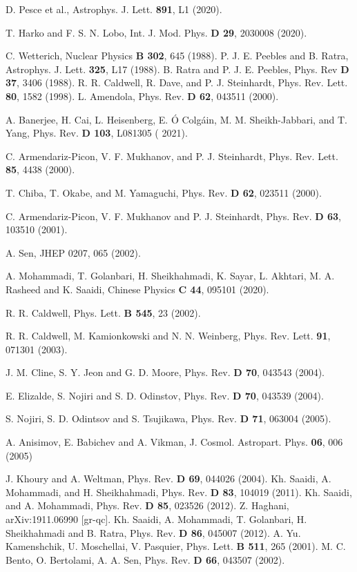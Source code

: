 \documentclass[aps,superscriptaddress, showpacs,preprintnumbers, superscriptaddress, nofootinbibt,twocolumn]{revtex4}
\begin{document}
\begin{thebibliography}{99}
  D. Pesce et al.,  Astrophys. J. Lett. {\bf 891}, L1 (2020).

 T. Harko and F. S. N. Lobo, Int. J. Mod. Phys. {\bf D 29}, 2030008 (2020).

 C. Wetterich, Nuclear Physics {\bf B 302}, 645 (1988).
 P. J. E. Peebles and B. Ratra, Astrophys. J. Lett. {\bf 325},
L17 (1988).
  B. Ratra and P. J. E. Peebles, Phys. Rev {\bf D 37}, 3406
(1988).
 R. R. Caldwell, R. Dave, and P. J. Steinhardt, Phys.
Rev. Lett. {\bf 80}, 1582 (1998).
  L. Amendola, Phys. Rev. {\bf D 62}, 043511 (2000).

 A. Banerjee, H. Cai, L. Heisenberg, E. \'{O} Colg\'{a}in, M. M. Sheikh-Jabbari, and T. Yang, Phys. Rev. {\bf D 103}, L081305 ( 2021).

 C. Armendariz-Picon, V. F. Mukhanov, and P. J. Steinhardt, Phys. Rev. Lett. {\bf 85}, 4438 (2000).

 T. Chiba, T. Okabe, and  M. Yamaguchi, Phys. Rev. {\bf D 62}, 023511 (2000).

 C. Armendariz-Picon, V. F. Mukhanov and P. J. Steinhardt, Phys. Rev. {\bf D 63}, 103510 (2001).

  A. Sen, JHEP 0207, 065 (2002).

 A. Mohammadi, T. Golanbari, H. Sheikhahmadi, K. Sayar, L. Akhtari, M. A. Rasheed and K. Saaidi, Chinese
Physics {\bf C 44}, 095101 (2020).

 R. R. Caldwell, Phys. Lett. {\bf B 545}, 23 (2002).

  R. R. Caldwell, M. Kamionkowski and N. N. Weinberg,
Phys. Rev. Lett. {\bf 91}, 071301 (2003).

  J. M. Cline, S. Y. Jeon and G. D. Moore, Phys. Rev. {\bf D 70}, 043543 (2004).

 E. Elizalde, S. Nojiri and S. D. Odinstov, Phys. Rev. {\bf D 70}, 043539 (2004).

  S. Nojiri, S. D. Odintsov and S. Tsujikawa, Phys. Rev.
{\bf D 71}, 063004 (2005).

 A. Anisimov, E. Babichev and A. Vikman, J. Cosmol.
Astropart. Phys. {\bf 06}, 006 (2005)

 J. Khoury and A. Weltman, Phys. Rev. {\bf D 69}, 044026 (2004).
  Kh. Saaidi, A. Mohammadi, and H. Sheikhahmadi, Phys. Rev. {\bf D 83}, 104019 (2011).
 Kh. Saaidi, and A. Mohammadi, Phys. Rev. {\bf D 85}, 023526 (2012).
 Z. Haghani, arXiv:1911.06990 [gr-qc].
  Kh. Saaidi, A. Mohammadi, T. Golanbari, H. Sheikhahmadi and B. Ratra, Phys. Rev. {\bf D 86}, 045007 (2012).
 A. Yu. Kamenshchik, U. Moschellai, V. Pasquier, Phys.
Lett. {\bf B 511}, 265 (2001).
 M. C. Bento, O. Bertolami, A. A. Sen, Phys. Rev. {\bf D 66}, 043507 (2002).


\end{thebibliography}
\end{document}
